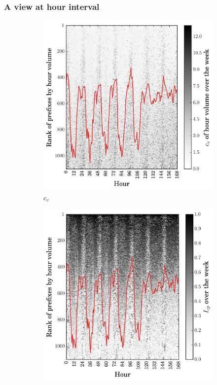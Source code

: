 \subsubsection{A view at hour interval}
\begin{figure}
\centering
		\centering
        \begin{subfigure}[b]{0.85\textwidth}
                \includegraphics[width=\textwidth]{gfx/chap2/cv_mat_sa.png}
                \caption{$c_v$}
                \label{fig:cv_mat_sa}
        \end{subfigure}
        \begin{subfigure}[b]{0.85\textwidth}
                \includegraphics[width=\textwidth]{gfx/chap2/cp_mat_sa.png}

\end{subfigure}
\end{figure}
